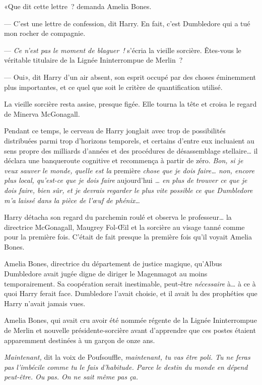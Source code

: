 «Que dit cette lettre~? demanda Amelia Bones.

--- C'est une lettre de confession, dit Harry. En fait, c'est Dumbledore qui a tué mon rocher de compagnie.

--- \emph{Ce n'est pas le moment de blaguer~!} s'écria la vieille sorcière. Êtes-vous le véritable titulaire de la Lignée Ininterrompue de Merlin~?

--- Oui», dit Harry d'un air absent, son esprit occupé par des choses éminemment plus importantes, et ce quel que soit le critère de quantification utilisé.

La vieille sorcière resta assise, presque figée. Elle tourna la tête et croisa le regard de Minerva McGonagall.

Pendant ce temps, le cerveau de Harry jonglait avec trop de possibilités distribuées parmi trop d'horizons temporels, et certains d'entre eux incluaient au sens propre des milliards d'années et des procédures de désassemblage stellaire… il déclara une banqueroute cognitive et recommença à partir de zéro. \emph{Bon, si je veux sauver le monde, quelle est la} première \emph{chose que je dois faire… non, encore plus local, qu'est-ce que je dois faire} aujourd'hui \emph{… en plus de trouver ce que je dois faire, bien sûr, et je devrais regarder le plus vite possible ce que Dumbledore m'a laissé dans la pièce de l'œuf de phénix…}

Harry détacha son regard du parchemin roulé et observa le professeur… la directrice McGonagall, Maugrey Fol-Œil et la sorcière au visage tanné comme pour la première fois. C'était de fait presque la première fois qu'il voyait Amelia Bones.

Amelia Bones, directrice du département de justice magique, qu'Albus Dumbledore avait jugée digne de diriger le Magenmagot au moins temporairement. Sa coopération serait inestimable, peut-être \emph{nécessaire} à… à ce à quoi Harry ferait face. Dumbledore l'avait choisie, et il avait lu des prophéties que Harry n'avait jamais vues.

Amelia Bones, qui avait cru avoir été nommée régente de la Lignée Ininterrompue de Merlin et nouvelle présidente-sorcière avant d'apprendre que ces postes étaient apparemment destinées à un garçon de onze ans.

\emph{Maintenant,} dit la voix de Poufsouffle, \emph{maintenant, tu vas être poli. Tu ne feras pas l'imbécile comme tu le fais d'habitude. Parce le destin du monde en dépend peut-être. Ou pas. On ne sait même pas ça.}

